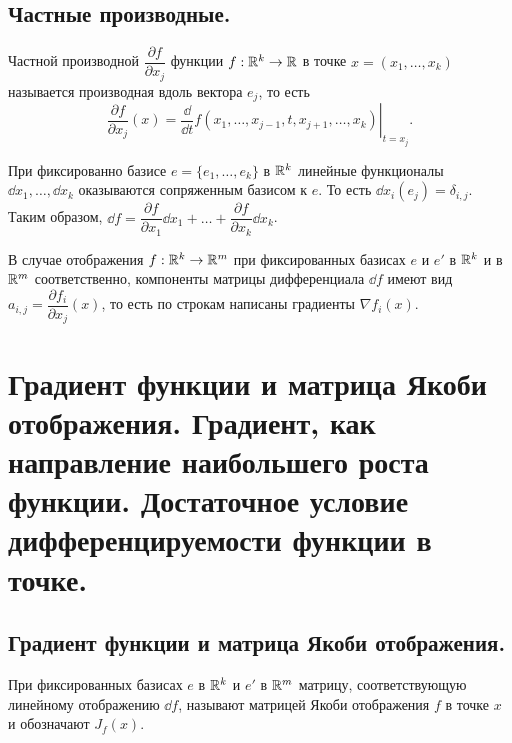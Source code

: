 \documentclass[a4paper]{article}
\theoremstyle{named}
\begin{document}
    \subsection{Частные производные.}

    \begin{definition*}
        Частной производной $\dfrac{\partial f}{\partial x_j}$ функции $f: \mathbb{R}^k \to \mathbb{R}$ в точке $x = (x_1, \dots, x_k)$ называется производная вдоль вектора $e_j$, то есть
        \begin{equation*}
            \dfrac{\partial f}{\partial x_j}(x) = \left.\dfrac{\dd}{\dd t}f(x_1, \dots, x_{j - 1}, t, x_{j + 1}, \dots, x_k)\right|_{t = x_j}.
        \end{equation*}
    \end{definition*}

    \begin{remark*}
        При фиксированно базисе $e = \{e_1, \dots, e_k\}$ в $\mathbb{R}^k$ линейные функционалы $\dd x_1, \dots, \dd x_k$ оказываются сопряженным базисом к $e$. То есть $\dd x_i(e_j) = \delta_{i, j}$. Таким образом, $\dd f = \dfrac{\partial f}{\partial x_1}\dd x_1 + \dots + \dfrac{\partial f}{\partial x_k}\dd x_k$.
    \end{remark*}

    \begin{remark*}
        В случае отображения $f: \mathbb{R}^k \to \mathbb{R}^m$ при фиксированных базисах $e$ и $e'$ в $\mathbb{R}^k$ и в $\mathbb{R}^m$ соответственно, компоненты матрицы дифференциала $\dd f$ имеют вид $a_{i, j} = \dfrac{\partial f_i}{\partial x_j}(x)$, то есть по строкам написаны градиенты $\nabla f_i(x)$.
    \end{remark*}

    \section{Градиент функции и матрица Якоби отображения. Градиент, как направление наибольшего роста функции. Достаточное условие дифференцируемости функции в точке.}

    \subsection{Градиент функции и матрица Якоби отображения.}

    \begin{definition*}
        При фиксированных базисах $e$ в $\mathbb{R}^k$ и $e'$ в $\mathbb{R}^m$ матрицу, соответствующую линейному отображению $\dd f$, называют матрицей Якоби отображения $f$ в точке $x$ и обозначают $J_f(x)$.
    \end{definition*}
\end{document}
